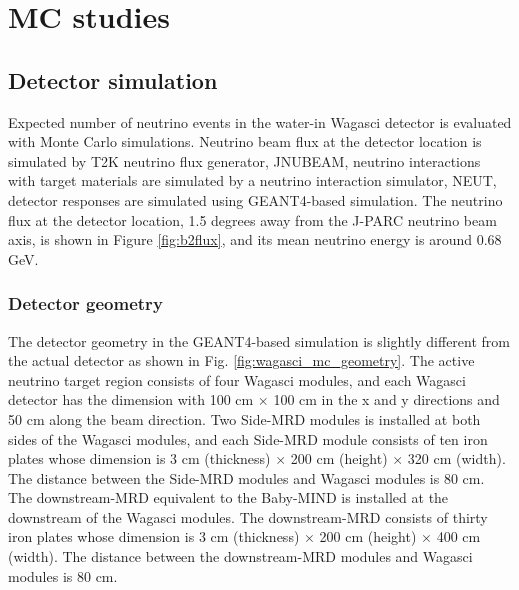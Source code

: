 \section{MC studies}
\label{sec:mc_study}

\subsection{Detector simulation}
Expected number of neutrino events in the water-in Wagasci detector is evaluated with Monte Carlo simulations. 
Neutrino beam flux at the detector location is simulated by T2K neutrino flux generator, JNUBEAM, neutrino interactions with target materials are simulated by a neutrino interaction simulator, NEUT, detector responses are simulated using GEANT4-based simulation.
The neutrino flux at the detector location, 1.5 degrees away from the J-PARC neutrino beam axis, is shown in Figure \ref{fig:b2flux}, and its mean neutrino energy is around 0.68 GeV.


\subsubsection{Detector geometry}
The detector geometry in the GEANT4-based simulation is slightly different from the actual detector as shown in Fig. \ref{fig:wagasci_mc_geometry}.
The active neutrino target region consists of four Wagasci modules, and each Wagasci detector has the dimension with 100 cm $\times$ 100 cm in the x and y directions and 50 cm along the beam direction.
Two Side-MRD modules is installed at both sides of the Wagasci modules, and each Side-MRD module consists of ten iron plates whose dimension is 3 cm (thickness) $\times$ 200 cm (height) $\times$ 320 cm (width). 
The distance between the Side-MRD modules and Wagasci modules is 80 cm.
The downstream-MRD equivalent to the Baby-MIND is installed at the downstream of the Wagasci modules.
The downstream-MRD consists of thirty iron plates whose dimension is  3 cm (thickness) $\times$ 200 cm (height) $\times$ 400 cm (width).
The distance between the downstream-MRD modules and Wagasci modules is 80 cm.

